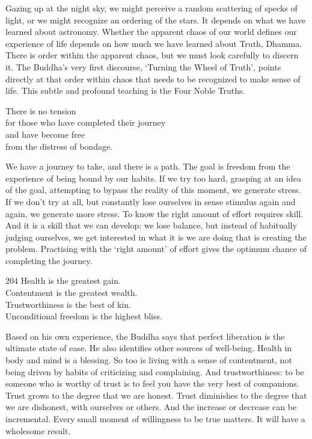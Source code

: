\begin{dhpRefl}
Gazing up at the night sky, we might perceive a random scattering of specks of light, or we might recognize an ordering of the stars. It depends on what we have learned about astronomy. Whether the apparent chaos of our world defines our experience of life depends on how much we have learned about Truth, Dhamma. There is order within the apparent chaos, but we must look carefully to discern it. The Buddha's very first discourse, `Turning the Wheel of Truth', points directly at that order within chaos that needs to be recognized to make sense of life. This subtle and profound teaching is the Four Noble Truths.
\end{dhpRefl}


\begin{dhpVerse}{90}
\label{dhp-90}
There is no tension\\
for those who have completed their journey\\
and have become free\\
from the distress of bondage.
\end{dhpVerse}

\begin{dhpRefl}
We have a journey to take, and there is a path. The goal is freedom from the experience of being bound by our habits. If we try too hard, grasping at an idea of the goal, attempting to bypass the reality of this moment, we generate stress. If we don't try at all, but constantly lose ourselves in sense stimulus again and again, we generate more stress. To know the right amount of effort requires skill. And it is a skill that we can develop: we lose balance, but instead of habitually judging ourselves, we get interested in what it is we are doing that is creating the problem. Practising with the `right amount' of effort gives the optimum chance of completing the journey.
\end{dhpRefl}


\begin{dhpVerse}{204}
\label{dhp-204}
Health is the greatest gain.\\
Contentment is the greatest wealth.\\
Trustworthiness is the best of kin.\\
Unconditional freedom is the highest bliss.
\end{dhpVerse}

\begin{dhpRefl}
Based on his own experience, the Buddha says that perfect liberation is the ultimate state of ease. He also identifies other sources of well-being. Health in body and mind is a blessing. So too is living with a sense of contentment, not being driven by habits of criticizing and complaining. And trustworthiness: to be someone who is worthy of trust is to feel you have the very best of companions. Trust grows to the degree that we are honest. Trust diminishes to the degree that we are dishonest, with ourselves or others. And the increase or decrease can be incremental. Every small moment of willingness to be true matters. It will have a wholesome result.
\end{dhpRefl}

